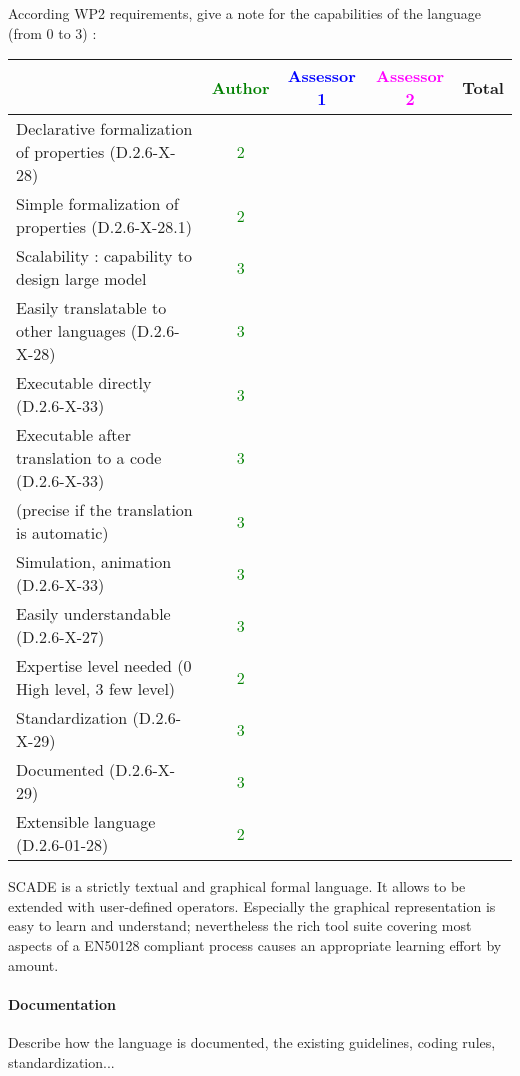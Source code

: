 According WP2 requirements, give a note for the capabilities of the language (from 0 to 3) :

\begin{tabular}{|l | c | c | c | c|}
\hline
& \textcolor{green}{Author} & \textcolor{blue}{Assessor 1} & \textcolor{magenta}{Assessor 2} & Total \\
\hline
Declarative formalization of properties (D.2.6-X-28) & \textcolor{green}{2}  & & & \\
\hline
Simple formalization of properties (D.2.6-X-28.1) & \textcolor{green}{2} & & & \\
\hline
Scalability : capability to design large model &  \textcolor{green}{3}  & & & \\
\hline
Easily translatable to other languages (D.2.6-X-28) &  \textcolor{green}{3}  & & & \\
\hline
Executable directly (D.2.6-X-33) & \textcolor{green}{3}  & & & \\
\hline
Executable after translation to a code (D.2.6-X-33) &  \textcolor{green}{3}& & & \\
(precise if the translation is automatic) &  \textcolor{green}{3}& & & \\
\hline
Simulation, animation (D.2.6-X-33) &  \textcolor{green}{3} & & & \\
\hline
Easily understandable (D.2.6-X-27) &  \textcolor{green}{3}& & & \\
\hline
Expertise level needed (0 High level, 3 few level) &  \textcolor{green}{2} & & & \\
\hline
Standardization (D.2.6-X-29) &  \textcolor{green}{3}& & & \\
\hline
Documented (D.2.6-X-29) &  \textcolor{green}{3} & & & \\
\hline
Extensible language (D.2.6-01-28) &  \textcolor{green}{2}& & & \\
\hline
\end{tabular}
\begin{author_comment}
SCADE is a strictly textual and graphical formal language. It allows to be extended with user-defined operators. Especially the graphical representation is easy to learn and understand; nevertheless the rich tool suite covering most aspects of a EN50128 compliant process causes an appropriate learning effort by amount.
\end{author_comment}


\paragraph{Documentation} Describe how the language is documented, the existing guidelines, coding rules, standardization...


